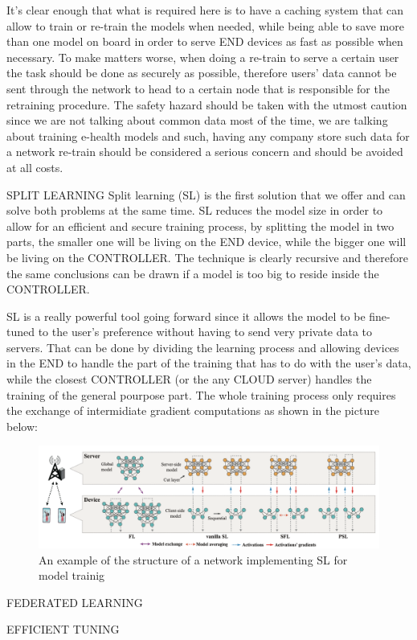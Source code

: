 It's clear enough that what is required here is to have a caching system that can allow to train or
re-train the models when needed, while being able to save more than one model on board in order to
serve END devices as fast as possible when necessary. To make matters worse, when doing a re-train
to serve a certain user the task should be done as securely as possible, therefore users' data
cannot be sent through the network to head to a certain node that is responsible for the retraining
procedure.
The safety hazard should be taken with the utmost caution since we are not talking about common data
most of the time, we are talking about training e-health models and such, having any company store
such data for a network re-train should be considered a serious concern and should be avoided at all costs.

SPLIT LEARNING
Split learning (SL) is the first solution that we offer and can solve both problems at the same time.
SL reduces the model size in order to allow for an efficient and secure training process, by
splitting the model in two parts, the smaller one will be living on the END device, while the bigger
one will be living on the CONTROLLER. The technique is clearly recursive and therefore the same
conclusions can be drawn if a model is too big to reside inside the CONTROLLER.

SL is a really powerful tool going forward since it allows the model to be fine-tuned to the user's
preference without having to send very private data to servers. That can be done by dividing the
learning process and allowing devices in the END to handle the part of the training that has to do
with the user's data, while the closest CONTROLLER (or the any CLOUD server) handles the training of
the general pourpose part. The whole training process only requires the exchange of intermidiate
gradient computations as shown in the picture below:
\begin{figure}
	\center
	\includegraphics[scale=0.65]{figures/split-learning.png}
	\caption{An example of the structure of a network implementing SL for model trainig
		\cite{split-learning}}
\end{figure}

FEDERATED LEARNING

EFFICIENT TUNING
